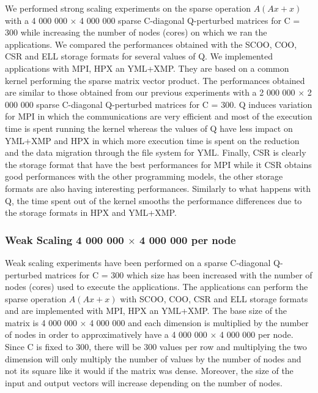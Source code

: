 We performed strong scaling experiments on the sparse operation $A(Ax+x)$ with a 4 000 000 $\times$ 4 000 000 sparse C-diagonal Q-perturbed matrices for C = 300 while increasing the number of nodes (cores) on which we ran the applications.
We compared the performances obtained with the SCOO, COO, CSR and ELL storage formats for several values of Q.
We implemented applications with MPI, HPX an YML+XMP.
They are based on a common kernel performing the sparse matrix vector product.
The performances obtained are similar to those obtained from our previous experiments with a 2 000 000 $\times$ 2 000 000 sparse C-diagonal Q-perturbed matrices for C = 300.
Q induces variation for MPI in which the communications are very efficient and most of the execution time is spent running the kernel whereas the values of Q have less impact on YML+XMP and HPX in which more execution time is spent on the reduction and the data migration through the file system for YML.
Finally, CSR is clearly the storage format that have the best performances for MPI while it CSR obtains good performances with the other programming models, the other storage formats are also having interesting performances.
Similarly to what happens with Q, the time spent out of the kernel smooths the performance differences due to the storage formats in HPX and YML+XMP.

\subsubsection{Weak Scaling 4 000 000 $\times$ 4 000 000 per node}

Weak scaling experiments have been performed on a sparse C-diagonal Q-perturbed matrices for C = 300 which size has been increased with the number of nodes (cores) used to execute the applications.
The applications can perform the sparse operation $A(Ax+x)$ with SCOO, COO, CSR and ELL storage formats and are implemented with MPI, HPX an YML+XMP.
The base size of the matrix is 4 000 000 $\times$ 4 000 000 and each dimension is multiplied by the number of nodes in order to approximatively have a 4 000 000 $\times$ 4 000 000 per node.
Since C is fixed to 300, there will be 300 values per row and multiplying the two dimension will only multiply the number of values by the number of nodes and not its square like it would if the matrix was dense.
Moreover, the size of the input and output vectors will increase depending on the number of nodes.

